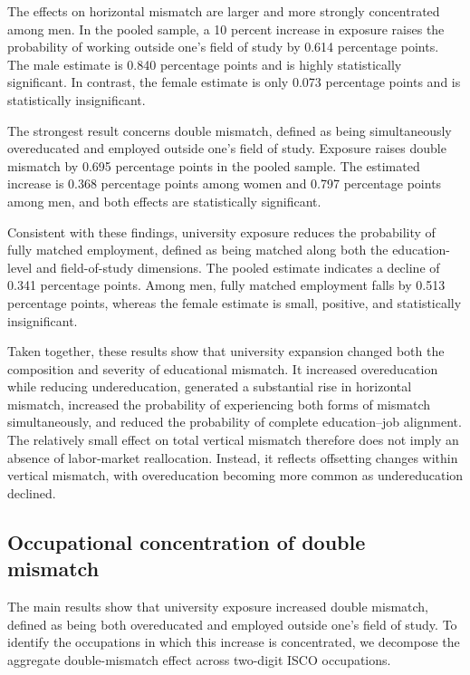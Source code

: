 The effects on horizontal mismatch are larger and more strongly concentrated among men. In the pooled sample, a 10 percent increase in exposure raises the probability of working outside one's field of study by 0.614 percentage points. The male estimate is 0.840 percentage points and is highly statistically significant. In contrast, the female estimate is only 0.073 percentage points and is statistically insignificant.

The strongest result concerns double mismatch, defined as being simultaneously overeducated and employed outside one's field of study. Exposure raises double mismatch by 0.695 percentage points in the pooled sample. The estimated increase is 0.368 percentage points among women and 0.797 percentage points among men, and both effects are statistically significant.

Consistent with these findings, university exposure reduces the probability of fully matched employment, defined as being matched along both the education-level and field-of-study dimensions. The pooled estimate indicates a decline of 0.341 percentage points. Among men, fully matched employment falls by 0.513 percentage points, whereas the female estimate is small, positive, and statistically insignificant.

Taken together, these results show that university expansion changed both the composition and severity of educational mismatch. It increased overeducation while reducing undereducation, generated a substantial rise in horizontal mismatch, increased the probability of experiencing both forms of mismatch simultaneously, and reduced the probability of complete education--job alignment. The relatively small effect on total vertical mismatch therefore does not imply an absence of labor-market reallocation. Instead, it reflects offsetting changes within vertical mismatch, with overeducation becoming more common as undereducation declined.

\subsection{Occupational concentration of double mismatch}

The main results show that university exposure increased double mismatch, defined as being both overeducated and employed outside one's field of study. To identify the occupations in which this increase is concentrated, we decompose the aggregate double-mismatch effect across two-digit ISCO occupations.

